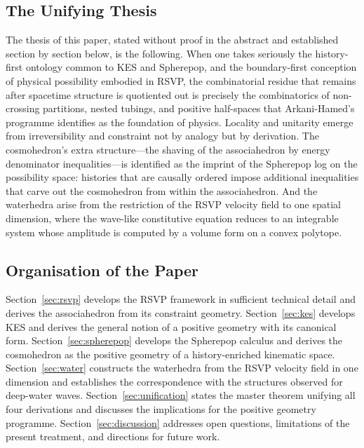 \documentclass[12pt, oneside]{amsart}
\theoremstyle{plain}
\theoremstyle{definition}
\theoremstyle{remark}
\begin{document}
\subsection{The Unifying Thesis}

The thesis of this paper, stated without proof in the abstract and established section by section below, is the following. When one takes seriously the history-first ontology common to KES and Spherepop, and the boundary-first conception of physical possibility embodied in RSVP, the combinatorial residue that remains after spacetime structure is quotiented out is precisely the combinatorics of non-crossing partitions, nested tubings, and positive half-spaces that Arkani-Hamed's programme identifies as the foundation of physics. Locality and unitarity emerge from irreversibility and constraint not by analogy but by derivation. The cosmohedron's extra structure---the shaving of the associahedron by energy denominator inequalities---is identified as the imprint of the Spherepop log on the possibility space: histories that are causally ordered impose additional inequalities that carve out the cosmohedron from within the associahedron. And the waterhedra arise from the restriction of the RSVP velocity field to one spatial dimension, where the wave-like constitutive equation reduces to an integrable system whose amplitude is computed by a volume form on a convex polytope.

\subsection{Organisation of the Paper}

Section~\ref{sec:rsvp} develops the RSVP framework in sufficient technical detail and derives the associahedron from its constraint geometry. Section~\ref{sec:kes} develops KES and derives the general notion of a positive geometry with its canonical form. Section~\ref{sec:spherepop} develops the Spherepop calculus and derives the cosmohedron as the positive geometry of a history-enriched kinematic space. Section~\ref{sec:water} constructs the waterhedra from the RSVP velocity field in one dimension and establishes the correspondence with the structures observed for deep-water waves. Section~\ref{sec:unification} states the master theorem unifying all four derivations and discusses the implications for the positive geometry programme. Section~\ref{sec:discussion} addresses open questions, limitations of the present treatment, and directions for future work.
\end{document}
